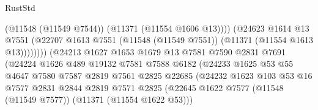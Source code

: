 \begin{lexlean}{RustStd}
\begin{coremodule}
                                              (@11548 (@11549 @7544))
                                              (@11371 (@11554 @1606 @13))))
                                          (@24623
                                            @1614
                                            @13
                                            @7551
                                            (@22707
                                              @1613
                                              @7551
                                              (@11548 (@11549 @7551))
                                              (@11371 (@11554 @1613 @13))))))))
                                  (@24213
                                    @1627
                                    @1653
                                    @1679
                                    @13
                                    @7581
                                    @7590
                                    @2831
                                    @7691
                                    (@24224
                                      @1626
                                      @489
                                      @19132
                                      @7581
                                      @7588
                                      @6182
                                      (@24233
                                        @1625
                                        @53
                                        @55
                                        @4647
                                        @7580
                                        @7587
                                        @2819
                                        @7561
                                        @2825
                                        @22685
                                        (@24232
                                          @1623
                                          @103
                                          @53
                                          @16
                                          @7577
                                          @2831
                                          @2844
                                          @2819
                                          @7571
                                          @2825
                                          (@22645
                                            @1622
                                            @7577
                                            (@11548 (@11549 @7577))
                                            (@11371 (@11554 @1622 @53)))

\end{coremodule}
\end{lexlean}
